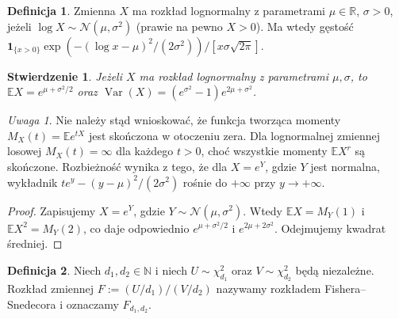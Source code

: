 \documentclass[11pt,a4paper,oneside]{report}
\numberwithin{equation}{chapter}
\theoremstyle{plain}
\newtheorem{stwierdzenie}[twierdzenie]{Stwierdzenie}
\theoremstyle{definition}
\newtheorem{definicja}{Definicja}[chapter]
\theoremstyle{remark}
\newtheorem{uwaga}{Uwaga}[chapter]
\newcommand{\R}{\mathbb{R}}
\newcommand{\N}{\mathbb{N}}
\newcommand{\E}{\mathbb{E}}
\newcommand{\Var}{\operatorname{Var}}
\newcommand{\ind}[1]{\mathbf{1}_{#1}}
\newcommand{\Normal}{\mathcal{N}}
\begin{document}
\begin{definicja}
Zmienna $X$ ma rozkład lognormalny z parametrami
$\mu\in\R$, $\sigma>0$, jeżeli $\log X\sim\Normal(\mu,\sigma^2)$
(prawie na pewno $X>0$). Ma wtedy gęstość
$\ind{\{x>0\}}\exp(- (\log x-\mu)^2/(2\sigma^2))
/[x\sigma\sqrt{2\pi}]$.
\end{definicja}

\begin{stwierdzenie}
Jeżeli $X$ ma rozkład lognormalny z parametrami $\mu,\sigma$,
to $\E X=e^{\mu+\sigma^2/2}$ oraz
$\Var(X)=(e^{\sigma^2}-1)e^{2\mu+\sigma^2}$.
\end{stwierdzenie}
\begin{uwaga}
Nie należy stąd wnioskować, że funkcja tworząca momenty
$M_X(t)=\E e^{tX}$ jest skończona w otoczeniu zera.
Dla lognormalnej zmiennej losowej $M_X(t)=\infty$
dla każdego $t>0$, choć wszystkie momenty
$\E X^r$ są skończone. Rozbieżność wynika z tego,
że dla $X=e^Y$, gdzie $Y$ jest normalna,
wykładnik $te^y-(y-\mu)^2/(2\sigma^2)$
rośnie do $+\infty$ przy $y\to+\infty$.
\end{uwaga}
\begin{proof}
Zapisujemy $X=e^Y$, gdzie $Y\sim\Normal(\mu,\sigma^2)$.
Wtedy $\E X=M_Y(1)$ i $\E X^2=M_Y(2)$,
co daje odpowiednio $e^{\mu+\sigma^2/2}$ i
$e^{2\mu+2\sigma^2}$. Odejmujemy kwadrat średniej.
\end{proof}

\begin{definicja}
Niech $d_1,d_2\in\N$ i niech $U\sim\chi^2_{d_1}$ oraz
$V\sim\chi^2_{d_2}$ będą niezależne. Rozkład zmiennej
$F:=(U/d_1)/(V/d_2)$ nazywamy rozkładem Fishera--Snedecora
i oznaczamy $F_{d_1,d_2}$.
\end{definicja}
\end{document}
